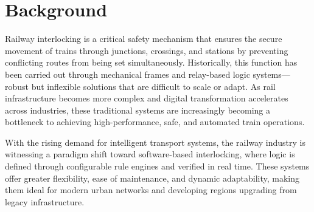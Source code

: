 \section{Background}
Railway interlocking is a critical safety mechanism that ensures the secure movement of trains through junctions, crossings, and stations by preventing conflicting routes from being set simultaneously. Historically, this function has been carried out through mechanical frames and relay-based logic systems—robust but inflexible solutions that are difficult to scale or adapt. As rail infrastructure becomes more complex and digital transformation accelerates across industries, these traditional systems are increasingly becoming a bottleneck to achieving high-performance, safe, and automated train operations.

With the rising demand for intelligent transport systems, the railway industry is witnessing a paradigm shift toward software-based interlocking, where logic is defined through configurable rule engines and verified in real time. These systems offer greater flexibility, ease of maintenance, and dynamic adaptability, making them ideal for modern urban networks and developing regions upgrading from legacy infrastructure.
